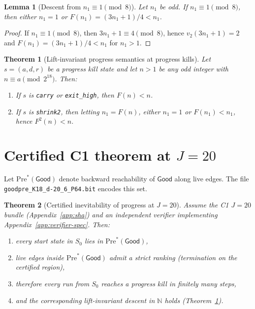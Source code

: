 \documentclass[11pt]{article}
\newtheorem{theorem}{Theorem}
\newtheorem{lemma}{Lemma}
\begin{document}
\begin{lemma}[Descent from $n_1\equiv 1\pmod 8$]
Let $n_1$ be odd. If $n_1\equiv 1\pmod 8$, then either $n_1=1$ or $F(n_1)=(3n_1+1)/4<n_1$.
\end{lemma}

\begin{proof}
If $n_1\equiv 1\pmod 8$, then $3n_1+1\equiv 4\pmod 8$, hence $v_2(3n_1+1)=2$ and $F(n_1)=(3n_1+1)/4<n_1$ for $n_1>1$.
\end{proof}

\begin{theorem}[Lift-invariant progress semantics at progress kills]
\label{thm:kill-soundness}
Let $s=(a,d,r)$ be a progress kill state and let $n>1$ be any odd integer with $n\equiv a\pmod{2^{18}}$.
Then:
\begin{enumerate}
\item If $s$ is \texttt{carry} or \texttt{exit\_high}, then $F(n)<n$.
\item If $s$ is \texttt{shrink2}, then letting $n_1=F(n)$, either $n_1=1$ or $F(n_1)<n_1$, hence $F^2(n)<n$.
\end{enumerate}
\end{theorem}

\section{Certified C1 theorem at $J=20$}

Let $\mathrm{Pre}^*(\mathsf{Good})$ denote backward reachability of $\mathsf{Good}$ along live edges.
The file \texttt{goodpre\_K18\_d-20\_6\_P64.bit} encodes this set.

\begin{theorem}[Certified inevitability of progress at $J=20$]
\label{thm:certified-J20}
Assume the C1 $J=20$ bundle (Appendix~\ref{app:sha}) and an independent verifier implementing
Appendix~\ref{app:verifier-spec}.
Then:
\begin{enumerate}
\item every start state in $S_0$ lies in $\mathrm{Pre}^*(\mathsf{Good})$,
\item live edges inside $\mathrm{Pre}^*(\mathsf{Good})$ admit a strict ranking (termination on the certified region),
\item therefore every run from $S_0$ reaches a progress kill in finitely many steps,
\item and the corresponding lift-invariant descent in $\mathbb{N}$ holds (Theorem~\ref{thm:kill-soundness}).
\end{enumerate}
\end{theorem}
\end{document}
